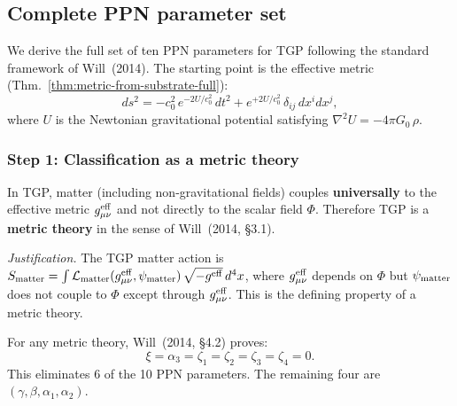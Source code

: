 
\subsection{Complete PPN parameter set}%
\label{ssec:ppn-full}

We derive the full set of ten PPN parameters for TGP following the
standard framework of Will~(2014).  The starting point is the
effective metric (Thm.~\ref{thm:metric-from-substrate-full}):
\begin{equation}\label{eq:metric-ppn}
  ds^2 = -c_0^2\,e^{-2U/c_0^2}\,dt^2 + e^{+2U/c_0^2}\,\delta_{ij}\,dx^i dx^j,
\end{equation}
where $U$ is the Newtonian gravitational potential satisfying
$\nabla^2 U = -4\pi G_0\,\rho$.

\subsubsection{Step 1: Classification as a metric theory}

\begin{proposition}\label{prop:metric-theory}
In TGP, matter (including non-gravitational fields) couples
\textbf{universally} to the effective metric $g^{\rm eff}_{\mu\nu}$
and not directly to the scalar field $\Phi$.  Therefore TGP is a
\textbf{metric theory} in the sense of Will~(2014, \S3.1).
\end{proposition}

\noindent\emph{Justification.}
The TGP matter action is
$S_{\rm matter} = \int \mathcal{L}_{\rm matter}(g^{\rm eff}_{\mu\nu}, \psi_{\rm matter})\,
\sqrt{-g^{\rm eff}}\,d^4x$,
where $g^{\rm eff}_{\mu\nu}$ depends on $\Phi$ but $\psi_{\rm matter}$
does not couple to $\Phi$ except through $g^{\rm eff}_{\mu\nu}$.
This is the defining property of a metric theory.

\medskip
For any metric theory, Will~(2014, \S4.2) proves:
\begin{equation}\label{eq:metric-theory-constraints}
  \boxed{
    \xi = \alpha_3 = \zeta_1 = \zeta_2 = \zeta_3 = \zeta_4 = 0.
  }
\end{equation}
This eliminates 6 of the 10 PPN parameters.
The remaining four are $(\gamma, \beta, \alpha_1, \alpha_2)$.

